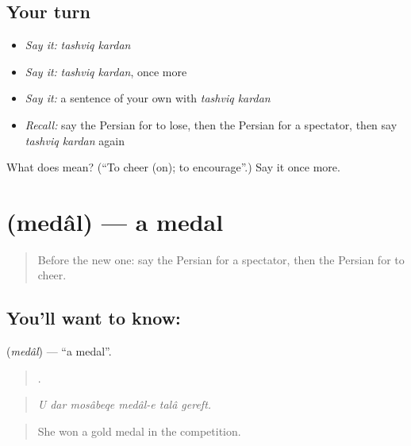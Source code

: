 \subsection*{Your turn}
\begin{itemize}
\raggedright
  \item \emph{Say it:} \emph{tashviq kardan}
  \item \emph{Say it:} \emph{tashviq kardan}, once more
  \item \emph{Say it:} a sentence of your own with \emph{tashviq kardan}
  \item \emph{Recall:} say the Persian for to lose, then the Persian for a spectator, then say \emph{tashviq kardan} again
\end{itemize}

\begin{tcolorbox}[breakable,colback=teal!4,colframe=teal!35!black,title={Before you move on}]
What does   mean? (\textquotedblleft{}To cheer (on); to encourage\textquotedblright{}.) Say it once more.
\end{tcolorbox}
\section[\texorpdfstring{\fa{مدال} (medâl)}{مدال (medâl)}]{ (medâl) — a medal}

\label{lesson:FA-C343-medal}



\begin{quote}
Before the new one: say the Persian for a spectator, then the Persian for to cheer.
\end{quote}

\subsection*{You'll want to know: }
\textbf{} (\emph{medâl}) — \textquotedblleft{}a medal\textquotedblright{}.

\begin{quote}
     .
\end{quote}

\begin{quote}
\emph{U dar mosâbeqe medâl-e talâ gereft.}
\end{quote}

\begin{quote}
She won a gold medal in the competition.
\end{quote}

